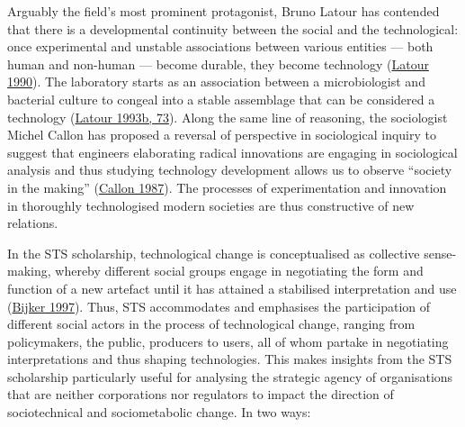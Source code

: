 \documentclass[a4paper, nobind]{templates/ociamthesis}
\begin{document}
Arguably the field's most prominent protagonist, Bruno Latour has contended that there is a developmental continuity between the social and the technological: once experimental and unstable associations between various entities --- both human and non-human --- become durable, they become technology (\protect\hyperlink{ref-latour_technology_1990}{Latour 1990}). The laboratory starts as an association between a microbiologist and bacterial culture to congeal into a stable assemblage that can be considered a technology (\protect\hyperlink{ref-latour_pasteurization_1993}{Latour 1993b, 73}). Along the same line of reasoning, the sociologist Michel Callon has proposed a reversal of perspective in sociological inquiry to suggest that engineers elaborating radical innovations are engaging in sociological analysis and thus studying technology development allows us to observe ``society in the making'' (\protect\hyperlink{ref-callon_society_1987}{Callon 1987}). The processes of experimentation and innovation in thoroughly technologised modern societies are thus constructive of new relations.

In the STS scholarship, technological change is conceptualised as collective sense-making, whereby different social groups engage in negotiating the form and function of a new artefact until it has attained a stabilised interpretation and use (\protect\hyperlink{ref-bijker_bicycles_1997}{Bijker 1997}). Thus, STS accommodates and emphasises the participation of different social actors in the process of technological change, ranging from policymakers, the public, producers to users, all of whom partake in negotiating interpretations and thus shaping technologies. This makes insights from the STS scholarship particularly useful for analysing the strategic agency of organisations that are neither corporations nor regulators to impact the direction of sociotechnical and sociometabolic change. In two ways:
\end{document}
